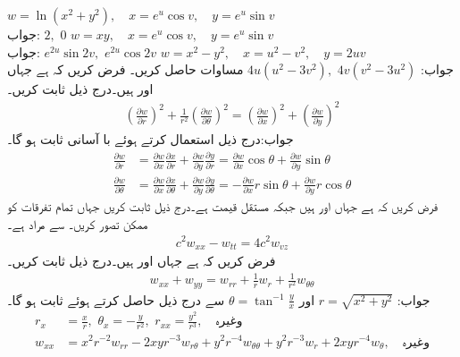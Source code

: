\quad
$w=\ln(x^2+y^2),\quad x=e^u\cos v,\quad y=e^u\sin v$\\
جواب:
$2,\,\, 0$
\quad
$w=xy,\quad x=e^u\cos v,\quad y=e^u\sin v$\\
جواب:
$e^{2u}\sin 2v,\,\,e^{2u}\cos 2v$
\quad
$w=x^2-y^2,\quad x=u^2-v^2,\quad y=2uv$\\
جواب:
$4u(u^2-3v^2),\,\,4v(v^2-3u^2)$
مساوات  حاصل کریں۔
فرض کریں کہ  ہے جہاں  اور  ہیں۔درج ذیل ثابت کریں۔
\begin{align*}
\left(\frac{\partial w}{\partial r}\right)^2+\frac{1}{r^2}\left(\frac{\partial w}{\partial \theta}\right)^2=\left(\frac{\partial w}{\partial x}\right)^2+\left(\frac{\partial w}{\partial y}\right)^2
\end{align*}
جواب:درج ذیل استعمال کرتے ہوئے با آسانی ثابت ہو گا۔
\begin{align*}
\frac{\partial w}{\partial r}&=\frac{\partial w}{\partial x}\frac{\partial x}{\partial r}+\frac{\partial w}{\partial y}\frac{\partial y}{\partial r}=
\frac{\partial w}{\partial x}\cos \theta +\frac{\partial w}{\partial y}\sin \theta \\
\frac{\partial w}{\partial \theta}&=\frac{\partial w}{\partial x}\frac{\partial x}{\partial \theta}+\frac{\partial w}{\partial y}\frac{\partial y}{\partial \theta}=
-\frac{\partial w}{\partial x}r\sin \theta +\frac{\partial w}{\partial y}r\cos\theta 
\end{align*}
فرض کریں کہ ہے جہاں   اور   ہیں جبکہ   مستقل قیمت  ہے۔درج ذیل ثابت کریں جہاں تمام تفرقات کو ممکن تصور کریں۔  سے مراد  ہے۔
\begin{align*}
c^2w_{xx}-w_{tt}=4c^2w_{vz}
\end{align*} 
فرض کریں کہ  ہے جہاں  اور  ہیں۔درج ذیل ثابت کریں۔
\begin{align*}
w_{xx}+w_{yy}=w_{rr}+\frac{1}{r}w_r+\frac{1}{r^2}w_{\theta \theta}
\end{align*}
جواب:
$r=\sqrt{x^2+y^2}$
اور
$\theta=\tan^{-1}\frac{y}{x}$
سے درج ذیل حاصل کرتے ہوئے ثابت ہو گا۔
\begin{align*}
r_x&=\frac{x}{r},\,\, \theta_x=-\frac{y}{r^2},\,\, r_{xx}=\frac{y^2}{r^3},\quad \text{وغیرہ}\\
 w_{xx}&=x^2r^{-2}w_{rr}-2xyr^{-3}w_{r\theta}+y^2r^{-4}w_{\theta\theta}+y^2r^{-3}w_r+2xyr^{-4}w_{\theta},\quad \text{وغیرہ}
\end{align*}

